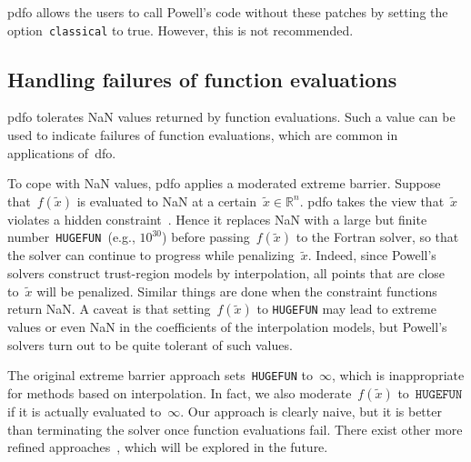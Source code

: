 \documentclass[
    smallextended,  %
    final,        %
]{svjour3}
\DeclareMathOperator\rank{rank}
\newcommand{\R}{\mathbb{R}}
\newcommand{\aeq}{A_{\scriptscriptstyle\mathcal{E}}}
\newcommand{\obj}{f}
\newcommand{\hugefun}{\texttt{HUGEFUN}\xspace}
\begin{document}
\gls{pdfo} allows the users to call Powell's code without these patches by setting the
option~\texttt{classical} to true. However, this is not recommended.


\subsection{Handling failures of function evaluations}

\gls{pdfo} tolerates NaN values returned by function evaluations. Such a value can be used to
indicate failures of function evaluations, which are common in applications of~\gls{dfo}.

To cope with NaN values, \gls{pdfo} applies a moderated extreme barrier.
Suppose that~$\obj(\tilde{x})$ is evaluated to NaN at a certain~$\tilde{x}\in\R^n$.
\gls{pdfo} takes the view that~$\tilde{x}$ violates a hidden
constraint~\mbox{\cite{LeDigabel_Wild_2015,Audet_Caporossi_Jacquet_2020}}.
Hence it replaces NaN with a large but finite number~\hugefun~(e.g., $10^{30}$)
before passing~$\obj(\tilde{x})$ to the Fortran solver, so that the solver can continue to progress while
penalizing~$\tilde{x}$. Indeed, since Powell's solvers construct trust-region models by interpolation,
all points that are close to~$\tilde{x}$ will be penalized.
Similar things are done when the constraint functions return NaN.
A caveat is that setting~$\obj(\tilde{x})$ to \hugefun may lead to
extreme values or even NaN in the coefficients of the interpolation models, but Powell's solvers
turn out to be quite tolerant of such values.

The original extreme barrier approach sets~\hugefun to~$\infty$, which is inappropriate for
methods based on interpolation. In fact, we also moderate~$\obj(\tilde{x})$ to~$\hugefun$ if it is
actually evaluated to~$\infty$.
Our approach is clearly naive, but it is better than terminating the solver once function
evaluations fail. There exist other more refined approaches~\cite{Audet_Caporossi_Jacquet_2020},
which will be explored in the future.


\end{document}

